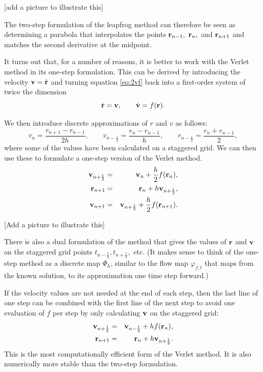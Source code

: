 \documentclass{article}
\begin{document}
[add a picture to illustrate this]

The two-step formulation of the leapfrog method can therefore be seen as determining a parabola that interpolates the points ${\bf r}_{n-1},~{\bf r}_{n},$ and ${\bf r}_{n+1}$ and matches the second derivative at the midpoint.

It turns out that, for a number of reasons, it is better to work with the Verlet method in its one-step formulation. This can be derived by introducing the velocity ${\bf v}=\dot{\bf r}$ and turning equation \ref{eq:2vf} back into a first-order system of twice the dimension
$$
	\dot{\bf r} = {\bf v},\qquad \dot{\bf v} = f({\bf r}).
$$

We then introduce discrete approximations of $r$ and $v$ as follows:
$$
v_n =\frac{r_{n+1}-r_{n-1}}{2h},\qquad v_{n-\frac12} = \frac{r_n-r_{n-1}}{h}, \qquad r_{n-\frac12} = \frac{r_n + r_{n-1}}{2},
$$
where some of the values have been calculated on a staggered grid. We can then use these to formulate a one-step version of the Verlet method. 
\begin{eqnarray*}
	{\bf v}_{n+\frac12} &=& {\bf v}_n+\frac{h}{2}f({\bf r}_n),\\
	{\bf r}_{n+1} &=& {\bf r}_n +h{\bf v}_{n+\frac12},\\
	{\bf v}_{n+1} &=& {\bf v}_{n+\frac12}+\frac{h}{2}f({\bf r}_{n+1}).
\end{eqnarray*}

[Add a picture to illustrate this]

There is also a dual formulation of the method that gives the values of ${\bf r}$ and ${\bf v}$ on the staggered grid points $t_{n-\frac12},t_{n+\frac12},$ etc.
(It makes sense to think of the one-step method as a discrete map $\Phi_h$, similar to the flow map $\varphi_{f,t}$ that maps from the known solution, to its approximation one time step forward.)

If the velocity values are not needed at the end of each step, then the last line of one step can be combined with the first line of the next step to avoid one evaluation of $f$ per step by only calculating ${\bf v}$ on the staggered grid:
\begin{eqnarray*}
	{\bf v}_{n+\frac12} &=& {\bf v}_{n-\frac12}+hf({\bf r}_n),\\
	{\bf r}_{n+1} &=& {\bf r}_n +h{\bf v}_{n+\frac12}.
\end{eqnarray*}
This is the most computationally efficient form of the Verlet method. It is also numerically more stable than the two-step formulation.
\end{document}
